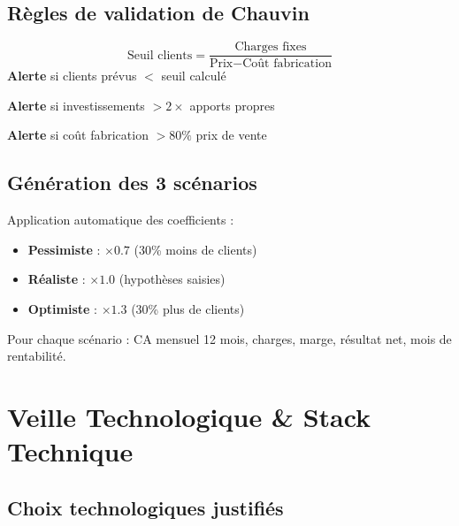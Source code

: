 \documentclass[11pt, a4paper]{article}
\begin{document}
\subsection{Règles de validation de Chauvin}

\begin{formulebox}[title={\bfseries\color{navyblue} Règle 1 — Seuil de rentabilité}]
\[
\text{Seuil clients} = \frac{\text{Charges fixes}}{\text{Prix} - \text{Coût fabrication}}
\]
\textbf{Alerte} si clients prévus $<$ seuil calculé
\end{formulebox}

\begin{formulebox}[title={\bfseries\color{navyblue} Règle 2 — Symétrie financement}]
\textbf{Alerte} si investissements $> 2 \times$ apports propres
\end{formulebox}

\begin{formulebox}[title={\bfseries\color{navyblue} Règle 3 — Cohérence prix/coût}]
\textbf{Alerte} si coût fabrication $> 80\%$ prix de vente
\end{formulebox}

\subsection{Génération des 3 scénarios}

Application automatique des coefficients :
\begin{itemize}
  \item \textbf{Pessimiste} : $\times 0.7$ (30\% moins de clients)
  \item \textbf{Réaliste} : $\times 1.0$ (hypothèses saisies)
  \item \textbf{Optimiste} : $\times 1.3$ (30\% plus de clients)
\end{itemize}

Pour chaque scénario : CA mensuel 12 mois, charges, marge, résultat net, mois de rentabilité.

\section{Veille Technologique \& Stack Technique}

\subsection{Choix technologiques justifiés}
\end{document}
